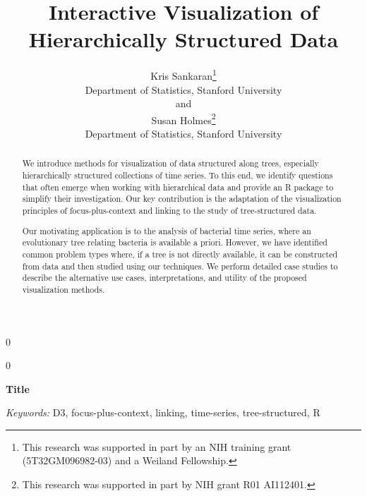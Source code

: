 \documentclass[12pt]{article}
\newcommand{\blind}{0}
\begin{document}
\def\spacingset#1{\renewcommand{\baselinestretch}%
{#1}\small\normalsize} \spacingset{1}



\blind
{
  \title{\bf Interactive Visualization of Hierarchically Structured Data}
  \author{Kris Sankaran\thanks{
      This research was supported in part by an NIH training grant (5T32GM096982-03) and a Weiland Fellowship.}\hspace{.2cm}\\
    Department of Statistics, Stanford University\\
    and \\
    Susan Holmes\thanks{
       This research was supported in part by NIH grant R01 AI112401.
      }\hspace{0.2cm}\\
    Department of Statistics, Stanford University}
  \maketitle
} \fi

\blind
{
  \bigskip
  \bigskip
  \bigskip
  \begin{center}
    {\LARGE\bf Title}
\end{center}
  \medskip
} \fi

\bigskip
\begin{abstract}
We introduce methods for visualization of data structured along trees,
especially hierarchically structured collections of time series.  To
this end, we identify questions that often emerge when working with
hierarchical data and provide an R package to simplify their
investigation. Our key contribution is the adaptation of the
visualization principles of focus-plus-context and linking to the
study of tree-structured data.

Our motivating application is to the analysis of bacterial time
series, where an evolutionary tree relating bacteria is available a
priori. However, we have identified common problem types where, if a
tree is not directly available, it can be constructed from data and
then studied using our techniques. We perform detailed case studies to
describe the alternative use cases, interpretations, and utility of
the proposed visualization methods.

\end{abstract}

\noindent%
{\it Keywords:}  D3, focus-plus-context, linking, time-series, tree-structured, R
\vfill
\end{document}
